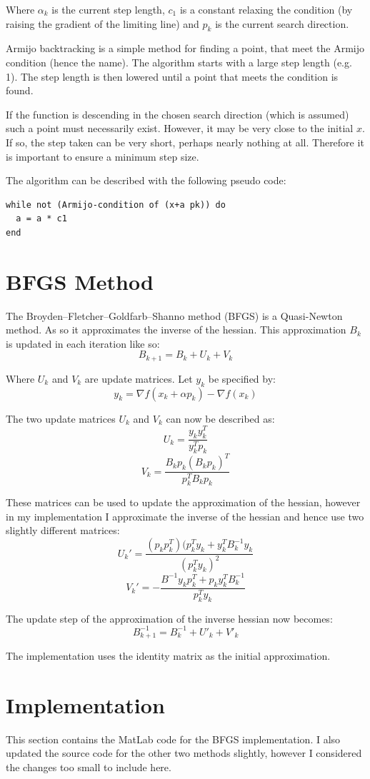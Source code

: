 \documentclass[10pt,oneside,a4paper,final,english]{memoir}
\begin{document}
Where $\alpha_k$ is the current step length, $c_1$ is a constant
relaxing the condition (by raising the gradient of the limiting line)
and $p_k$ is the current search direction.

Armijo backtracking is a simple method for finding a point, that meet
the Armijo condition (hence the name). The algorithm starts with a
large step length (e.g. 1). The step length is then lowered until a
point that meets the condition is found.

If the function is descending in the chosen search direction (which is
assumed) such a point must necessarily exist. However, it may be very
close to the initial $x$. If so, the step taken can be very short,
perhaps nearly nothing at all. Therefore it is important to ensure a
minimum step size.

The algorithm can be described with the following pseudo code:
\begin{verbatim}
while not (Armijo-condition of (x+a pk)) do
  a = a * c1
end
\end{verbatim}


\section{BFGS Method}
The Broyden–Fletcher–Goldfarb–Shanno method (BFGS) is a Quasi-Newton
method. As so it approximates the inverse of the hessian. This
approximation $B_k$ is updated in each iteration like so:
\[ B_{k+1} = B_k + U_k + V_k \]

Where $U_k$ and $V_k$ are update matrices. Let $y_k$ be specified by:
\[ y_k = \nabla f(x_k + \alpha p_k) - \nabla f(x_k) \]

The two update matrices $U_k$ and $V_k$ can now be described as:
\[ U_k = \frac{y_ky_k^T}{y_k^Tp_k} \]
\[ V_k = \frac{B_kp_k(B_kp_k)^T}{p_k^TB_kp_k} \]

These matrices can be used to update the approximation of the hessian,
however in my implementation I approximate the inverse of the hessian
and hence use two slightly different matrices:
\[ U_k' = \frac{(p_kp_k^T) (p_k^Ty_k + y_k^TB_k^{-1}y_k}{(p_k^Ty_k)^2} \]
\[ V_k' = - \frac{B^{-1}y_kp_k^T + p_ky_k^TB_k^{-1}}{p_k^Ty_k} \]

The update step of the approximation of the inverse hessian now
becomes:
\[ B^{-1}_{k+1} = B^{-1}_k + U'_k + V'_k \]

The implementation uses the identity matrix as the initial
approximation.


\section{Implementation}
This section contains the MatLab code for the BFGS implementation. I
also updated the source code for the other two methods slightly,
however I considered the changes too small to include here.
\end{document}
